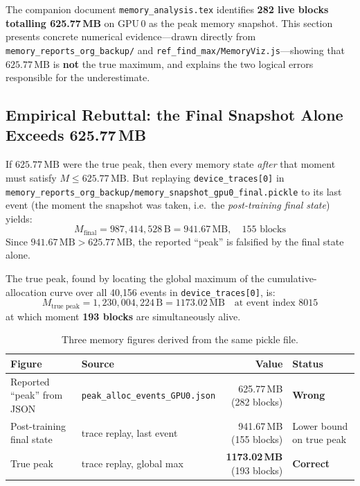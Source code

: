 \documentclass[11pt,a4paper]{article}
\begin{document}
The companion document \texttt{memory\_analysis.tex} identifies \textbf{282 live
blocks totalling 625.77\,MB} on GPU\,0 as the peak memory snapshot.
This section presents concrete numerical evidence---drawn directly from
\texttt{memory\_reports\_org\_backup/} and
\texttt{ref\_find\_max/MemoryViz.js}---showing that $625.77\,\mathrm{MB}$ is
\textbf{not} the true maximum, and explains the two logical errors responsible
for the underestimate.

\subsection{Empirical Rebuttal: the Final Snapshot Alone Exceeds 625.77\,MB}
\label{sec:simplebound}

\begin{insight}
If $625.77\,\mathrm{MB}$ were the true peak, then every memory state
\emph{after} that moment must satisfy $M \leq 625.77\,\mathrm{MB}$.
But replaying \texttt{device\_traces[0]} in
\texttt{memory\_reports\_org\_backup/memory\_snapshot\_gpu0\_final.pickle}
to its last event (the moment the snapshot was taken, i.e.\ the
\emph{post-training final state}) yields:
\begin{equation}
  M_{\text{final}} = 987{,}414{,}528\,\text{B} = 941.67\,\text{MB},
  \quad 155\text{ blocks}
  \label{eq:finalstate}
\end{equation}
Since $941.67\,\mathrm{MB} > 625.77\,\mathrm{MB}$, the reported ``peak''
is falsified by the final state alone.
\end{insight}

\noindent The true peak, found by locating the global maximum of the
cumulative-allocation curve over all 40{,}156 events in
\texttt{device\_traces[0]}, is:
\begin{equation}
  \boxed{M_{\text{true peak}} = 1{,}230{,}004{,}224\,\text{B}
         = 1173.02\,\text{MB} \quad \text{at event index 8015}}
  \label{eq:truepeak}
\end{equation}
at which moment \textbf{193 blocks} are simultaneously alive.

\begin{table}[h]
\centering
\caption{Three memory figures derived from the same pickle file.}
\label{tab:three_figures}
\begin{tabular}{llrl}
\toprule
\textbf{Figure} & \textbf{Source} & \textbf{Value} & \textbf{Status} \\
\midrule
Reported ``peak'' from JSON   & \texttt{peak\_alloc\_events\_GPU0.json}
  & 625.77\,MB (282 blocks) & \textcolor{alertred}{\textbf{Wrong}} \\
Post-training final state     & trace replay, last event
  & 941.67\,MB (155 blocks) & Lower bound on true peak \\
True peak                     & trace replay, global max
  & \textbf{1173.02\,MB} (193 blocks) & \textcolor{okgreen}{\textbf{Correct}} \\
\bottomrule
\end{tabular}
\end{table}
\end{document}
